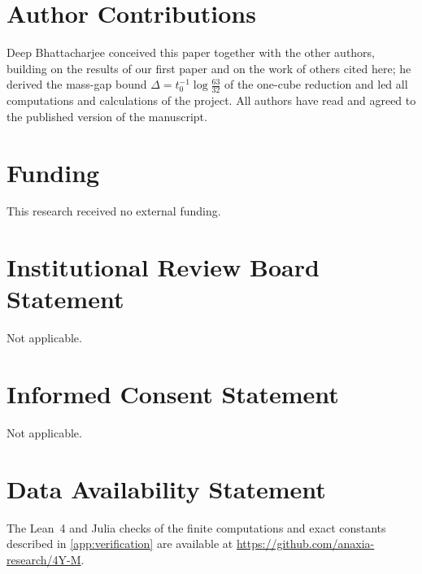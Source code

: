 \documentclass[11pt,a4paper]{amsart}
\theoremstyle{definition}
\theoremstyle{remark}
\numberwithin{equation}{section}
\begin{document}
\FloatBarrier
\section*{Author Contributions}
Deep Bhattacharjee conceived this paper together with the other authors, building on the results of our first paper \cite{bhattacharjee2026first} and on the work of others cited here; he derived the mass-gap bound $\Delta=t_0^{-1}\log\frac{63}{32}$ of the one-cube reduction and led all computations and calculations of the project. All authors have read and agreed to the published version of the manuscript.

\section*{Funding}
This research received no external funding.

\section*{Institutional Review Board Statement}
Not applicable.

\section*{Informed Consent Statement}
Not applicable.

\section*{Data Availability Statement}
The Lean~4 and Julia checks of the finite computations and exact constants described in \cref{app:verification} are available at \url{https://github.com/anaxia-research/4Y-M}.
\end{document}
